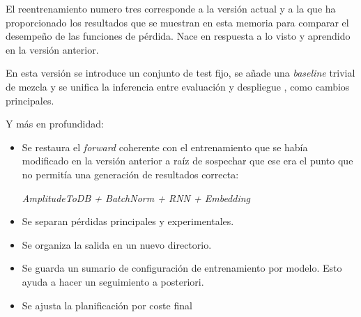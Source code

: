 El reentrenamiento numero tres corresponde a la versión actual y a la que ha proporcionado los resultados que se muestran en esta memoria para comparar el desempeño de las funciones de pérdida. Nace en respuesta a lo visto y aprendido en la versión anterior.

En esta versión se introduce un conjunto de test fijo, se añade una \textit{baseline} trivial de mezcla y se unifica la inferencia entre evaluación y despliegue , como cambios principales.

Y más en profundidad:
\begin{itemize}
    \item Se restaura el \textit{forward} coherente con el entrenamiento que se había modificado en la versión anterior a raíz de sospechar que ese era el punto que no permitía una generación de resultados correcta: 
    
    \textit{AmplitudeToDB + BatchNorm + RNN + Embedding}
    \item Se separan pérdidas principales y experimentales.
    \item Se organiza la salida en un nuevo directorio.
    \item Se guarda un sumario de configuración de entrenamiento por modelo. Esto ayuda a hacer un seguimiento a posteriori.
    \item Se ajusta la planificación por coste final
\end{itemize}